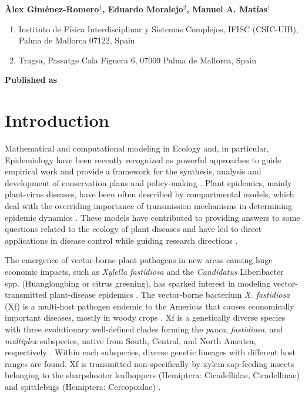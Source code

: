 \vspace{1cm}

\textbf{Àlex Giménez-Romero$^{1}$, Eduardo Moralejo$^{2}$, Manuel A.
    Matías$^{1}$}

\vspace{1cm}

\begin{enumerate}
    \small
    \item Instituto de Física Interdisciplinar y Sistemas Complejos, IFISC
          (CSIC-UIB), Palma de Mallorca 07122, Spain
    \item Tragsa, Passatge Cala Figuera 6, 07009 Palma de Mallorca, Spain
\end{enumerate}

\vspace{1cm}

\textbf{Published as}

\vspace{0.5cm}


\newpage
\section{Introduction}

Mathematical and computational modeling in Ecology and, in particular,
Epidemiology have been recently recognized as powerful approaches to guide
empirical work and provide a framework for the synthesis, analysis and
development of conservation plans and policy-making
\cite{levin1992mathematics,murray1989mathematical,sarkar2006biodiversity,Chew2014}.
Plant epidemics, mainly plant-virus diseases, have been often described by
compartmental models, which deal with the overriding importance of transmission
mechanisms in determining epidemic dynamics
\cite{Jeger1998,Jeger2004,Madden2000}. These models have contributed to
providing answers to some questions related to the ecology of plant diseases
and have led to direct applications in disease control while guiding research
directions \cite{Jeger2019}.

The emergence of vector-borne plant pathogens in new areas causing huge
economic impacts, such as \textit{Xylella fastidiosa} and the
\textit{Candidatus} Liberibacter spp. (Huanglongbing or citrus greening), has
sparked interest in modeling vector-transmitted plant-disease epidemics
\cite{chiyaka2012modeling,Jeger2019}. The vector-borne bacterium \textit{X.
    fastidiosa} (Xf) is a multi-host pathogen endemic to the Americas that
causes
economically important diseases, mostly in woody crops \cite{Hopkins2002}. Xf
is a genetically diverse species with three evolutionary well-defined clades
forming the \textit{pauca}, \textit{fastidiosa}, and \textit{multiplex}
subspecies, native from South, Central, and North America, respectively
\cite{vanhove2019genomic}. Within each subspecies, diverse genetic lineages
with different host ranges are found. Xf is transmitted non-specifically by
xylem-sap-feeding insects belonging to the sharpshooter leafhoppers (Hemiptera:
Cicadellidae, Cicadellinae) and spittlebugs (Hemiptera: Cercopoidae)
\cite{Redak2004}.

